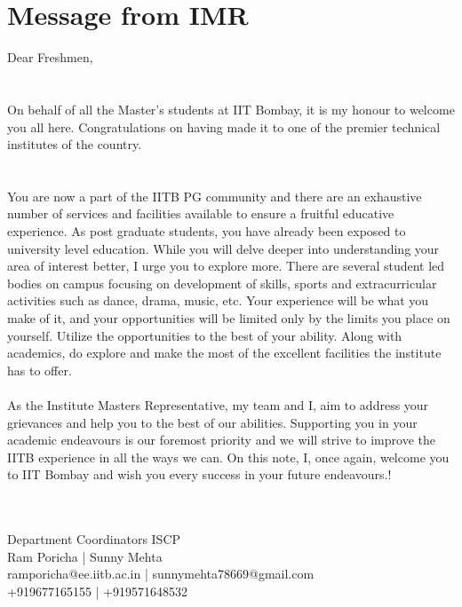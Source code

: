 \documentclass[11pt,fleqn,openany]{book} %
\begin{document}

\chapter{Message from IMR}

Dear Freshmen,\\
\\
\\
On behalf of all the Master’s students at IIT Bombay, it is my honour to welcome you all here. Congratulations on having made it to one of the premier technical institutes of the country.\\
\\
\\
You are now a part of the IITB PG community and there are an exhaustive number of services and facilities available to ensure a fruitful educative experience. As post graduate students, you have already been exposed to university level education. While you will delve deeper into understanding your area of interest better, I urge you to explore more. There are several student led bodies on campus focusing on development of skills, sports and extracurricular activities such as dance, drama, music, etc. Your experience will be what you make of it, and your opportunities will be limited only by the limits you place on yourself. Utilize the opportunities to the best of your ability. Along with academics, do explore and make the most of the excellent facilities the institute has to offer.\\
\\
As the Institute Masters Representative, my team and I, aim to address your grievances and help you to the best of our abilities. Supporting you in your academic endeavours is our foremost priority and we will strive to improve the IITB experience in all the ways we can. On this note, I, once again, welcome you to IIT Bombay and wish you every success in your future endeavours.!\\
\\
\\
\begin{center}
    Department Coordinators ISCP\\
    Ram Poricha | Sunny Mehta\\
ramporicha@ee.iitb.ac.in | sunnymehta78669@gmail.com\\
+919677165155 | +919571648532
\end{center}

\end{document}
